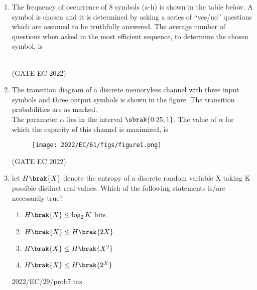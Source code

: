 \begin{enumerate}
\item The frequency of occurrence of 8 symbols (a-h) is shown in the table below. A
symbol is chosen and it is determined by asking a series of “yes/no” questions which
are assumed to be truthfully answered. The average number of questions when asked
in the most efficient sequence, to determine the chosen symbol, is \\
\begin{table}[h]
	
\end{table} \\
\solution
\hfill(GATE EC 2022)

\item The transition diagram of a discrete memoryless channel with three input symbols
and three output symbols is shown in the figure. The transition probabilities are as
marked.\\
The parameter $\alpha$ lies in the interval $\sbrak{0.25,1}$. The value of $\alpha$ for which the capacity of this channel is maximized, is
\begin{figure}[!ht]
\centering
\texttt{[image: 2022/EC/61/figs/figure1.png]}
\label{Fig:1}
\end{figure}
\hfill(GATE EC 2022)

\item let $H\brak{X}$ denote the entropy of a discrete
random variable X taking K possible distinct
real values. Which of the following statements
is/are necessarily true?
\begin{enumerate}[label=(\Alph*)]
\item 
$H\brak{X}\leq \log _{2} K$ bits\\
\item 
$H\brak{X} \leq H\brak{2X}$\\
\item
$H\brak{X}\leq H\brak{X^2}$\\
\item
$H\brak{X} \leq H\brak{2^X}$\\
\end{enumerate}
 {2022/EC/29/prob7.tex}
\end{enumerate}

